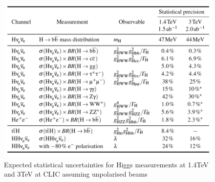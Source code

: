 \begin{figure}
  \centering
  \includegraphics[width=0.7\linewidth]{Theory/fig/table29_HighEPrecisions}
  \caption[Expected statistical uncertainties for Higgs measurements at 1.4TeV and 3TeV at CLIC assuming unpolarised beams]{Expected statistical uncertainties for Higgs measurements at 1.4TeV and 3TeV at CLIC assuming unpolarised beams}
  \label{fig:HighENumbers}
\end{figure}

